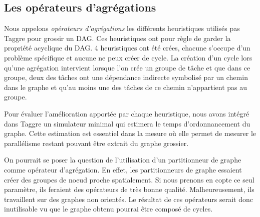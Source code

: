 \subsection{Les opérateurs d'agrégations}
Nous appelons {\em opérateurs d'agrégations} les différents heuristiques utilisés pas Taggre pour grossir un DAG.
%
Ces heuristiques ont pour règle de garder la propriété acyclique du DAG.
%
4 heuristiques ont été crées, chacune s'occupe d'un problème spécifique et aucune ne peux créer de cycle.
%
La création d'un cycle lors qu'une agrégation intervient lorsque l'on crée un groupe de tâche et que dans ce groupe, deux des tâches ont une dépendance indirecte symbolisé par un chemin dans le graphe et qu'au moins une des tâches de ce chemin n'appartient pas au groupe.


Pour évaluer l'amélioration apportée par chaque heuristique, nous avons intégré dans Taggre un simulateur minimal qui estimera le temps d'ordonnancement du graphe.
%
Cette estimation est essentiel dans la mesure où elle permet de mesurer le parallélisme restant pouvant être extrait du graphe grossier.

On pourrait se poser la question de l'utilisation d'un partitionneur de graphe comme opérateur d'agrégation.
%
En effet, les partitionneurs de graphe essaient créer des groupes de noeud proche spatialement.
%
Si nous prenons en copte ce seul paramètre, ils feraient des opérateurs de très bonne qualité.
%
Malheureusement, ils travaillent sur des graphes non orientés.
%
Le résultat de ces opérateurs serait donc inutilisable vu que le graphe obtenu pourrai être composé de cycles.
